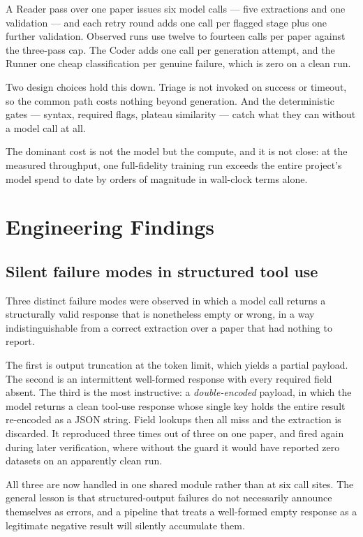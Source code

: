 \documentclass[10pt,twocolumn]{article}
\begin{document}
A Reader pass over one paper issues six model calls --- five extractions and one
validation --- and each retry round adds one call per flagged stage plus one further
validation. Observed runs use twelve to fourteen calls per paper against the three-pass
cap. The Coder adds one call per generation attempt, and the Runner one cheap
classification per genuine failure, which is zero on a clean run.

Two design choices hold this down. Triage is not invoked on success or timeout, so the
common path costs nothing beyond generation. And the deterministic gates --- syntax,
required flags, plateau similarity --- catch what they can without a model call at all.

The dominant cost is not the model but the compute, and it is not close: at the measured
throughput, one full-fidelity training run exceeds the entire project's model spend to
date by orders of magnitude in wall-clock terms alone.

\section{Engineering Findings}
\label{sec:findings}

\subsection{Silent failure modes in structured tool use}

Three distinct failure modes were observed in which a model call returns a structurally
valid response that is nonetheless empty or wrong, in a way indistinguishable from a
correct extraction over a paper that had nothing to report.

The first is output truncation at the token limit, which yields a partial payload.
The second is an intermittent well-formed response with every required field absent.
The third is the most instructive: a \emph{double-encoded} payload, in which the model
returns a clean tool-use response whose single key holds the entire result re-encoded as
a JSON string. Field lookups then all miss and the extraction is discarded. It reproduced
three times out of three on one paper, and fired again during later verification, where
without the guard it would have reported zero datasets on an apparently clean run.

All three are now handled in one shared module rather than at six call sites. The general
lesson is that structured-output failures do not necessarily announce themselves as
errors, and a pipeline that treats a well-formed empty response as a legitimate negative
result will silently accumulate them.
\end{document}
